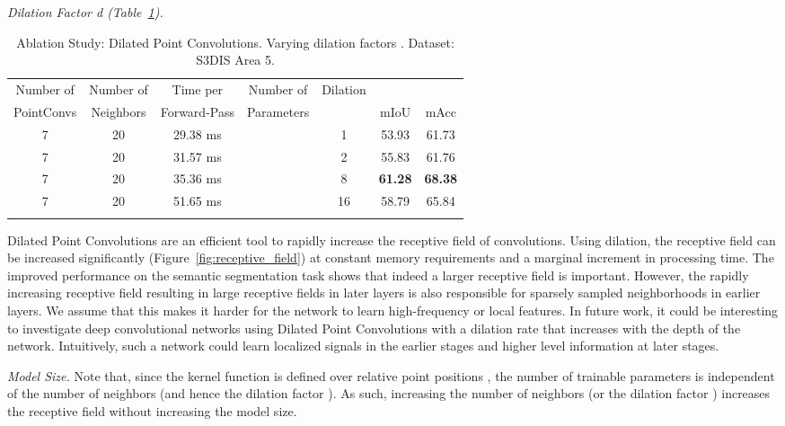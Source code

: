 \documentclass[letterpaper, 10 pt, conference]{ieeeconf}
\newcommand{\reffig}[1]{Figure~\ref{fig:#1}}
\newcommand{\reftab}[1]{Table~\ref{tab:#1}}
\newcommand{\parag}[1]{\vspace{0ex} \textit{#1}}
\begin{document}
\parag{Dilation Factor \textit{d} (\reftab{segmentation_results_stanford_dilation}).}
\begin{table}[t]
\center
\vspace{5px}
\caption{Ablation Study: Dilated Point Convolutions. Varying dilation factors . Dataset: S3DIS Area 5.
}
\resizebox{0.99\columnwidth}{!}
{\setlength{\tabcolsep}{3pt}
\begin{tabular}{ccccccc}
\toprule 
{Number of}   & {Number of}     & {Time per}     & {Number of}  & {Dilation} & &\\
{PointConvs} & {Neighbors } & {Forward-Pass} & {Parameters}&  & {mIoU} & {mAcc}\\
\midrule
7 &  20 & 29.38 ms &  &1 & 53.93 & 61.73\\
7 &  20 & 31.57 ms &  &2 & 55.83 & 61.76\\
7 &  20 & 35.36 ms &  &8 & \textbf{61.28} & \textbf{68.38}\\
7 &  20 & 51.65 ms &  &16 & 58.79 & 65.84\\
\bottomrule 
\vspace{-17px}
\end{tabular}
}
\label{tab:segmentation_results_stanford_dilation}    
\end{table} Dilated Point Convolutions are an efficient tool to rapidly increase the receptive field of convolutions.
Using dilation, the receptive field can be increased significantly (\reffig{receptive_field}) at constant memory requirements and a marginal increment in processing time.
The improved performance on the semantic segmentation task shows that indeed a larger receptive field is important.
However, the rapidly increasing receptive field resulting in large receptive fields in later layers is also responsible for sparsely sampled neighborhoods in earlier layers.
We assume that this makes it harder for the network to learn high-frequency or local features.
In future work, it could be interesting to investigate deep convolutional networks using Dilated Point Convolutions with a dilation rate  that increases with the depth of the network.
Intuitively, such a network could learn localized signals in the earlier stages and higher level information at later stages.

\parag{Model Size.}
Note that, since the kernel function  is defined over relative point positions , the number of trainable parameters is independent of the number of neighbors  (and hence the dilation factor ). As such, increasing the number of neighbors  (or the dilation factor ) increases the receptive field without increasing the model size. 
\end{document}
